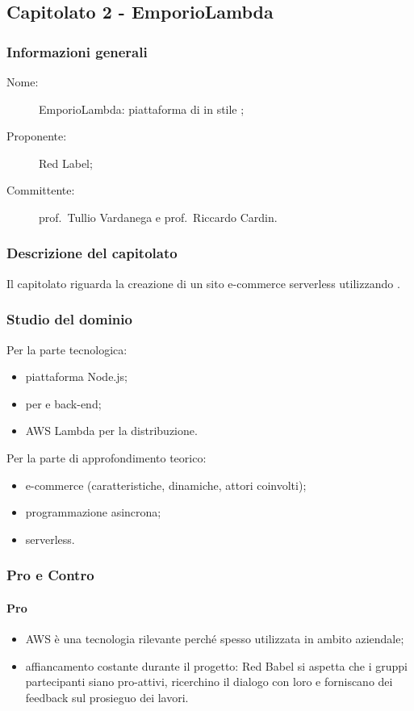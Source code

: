 \subsection{Capitolato 2 - EmporioLambda}
\subsubsection{Informazioni generali}
\begin{description}
	\item[Nome:] EmporioLambda: piattaforma di  in stile ;
	\item[Proponente:] Red Label;
	\item[Committente:] prof.~Tullio Vardanega e prof.~Riccardo Cardin.
\end{description}
\subsubsection{Descrizione del capitolato}
Il capitolato riguarda la creazione di un sito e-commerce serverless utilizzando .
\subsubsection{Studio del dominio}
Per la parte tecnologica:
\begin{itemize}
	\item piattaforma Node.js;
	\item {} per  e back-end;
	\item AWS Lambda per la distribuzione.
\end{itemize}
Per la parte di approfondimento teorico:
\begin{itemize}
	\item e-commerce (caratteristiche, dinamiche, attori coinvolti);
	\item programmazione asincrona;
	\item {} serverless.
\end{itemize}
\subsubsection{Pro e Contro}
\paragraph*{Pro}
\begin{itemize}
	\item AWS è una tecnologia rilevante perché spesso utilizzata in ambito aziendale;
	\item affiancamento costante durante il progetto: Red Babel si aspetta che i gruppi partecipanti siano pro-attivi, ricerchino il dialogo con loro e forniscano dei feedback sul prosieguo dei lavori.
\end{itemize}
